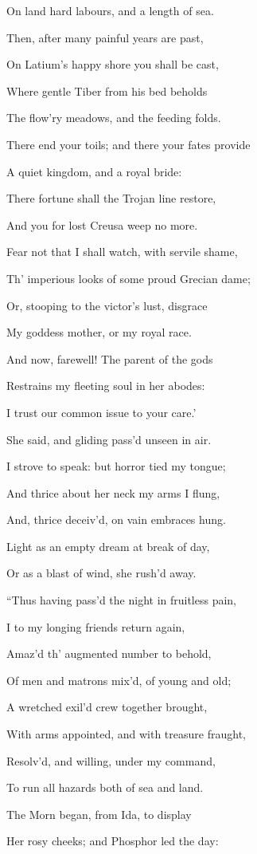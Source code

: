 On land hard labours, and a length of sea.

Then, after many painful years are past,

On Latium’s happy shore you shall be cast,

Where gentle Tiber from his bed beholds

The flow’ry meadows, and the feeding folds.

There end your toils; and there your fates provide

A quiet kingdom, and a royal bride:

There fortune shall the Trojan line restore,

And you for lost Creusa weep no more.

Fear not that I shall watch, with servile shame,

Th’ imperious looks of some proud Grecian dame;

Or, stooping to the victor’s lust, disgrace

My goddess mother, or my royal race.

And now, farewell! The parent of the gods

Restrains my fleeting soul in her abodes:

I trust our common issue to your care.’

She said, and gliding pass’d unseen in air.

I strove to speak: but horror tied my tongue;

And thrice about her neck my arms I flung,

And, thrice deceiv’d, on vain embraces hung.

Light as an empty dream at break of day,

Or as a blast of wind, she rush’d away.

“Thus having pass’d the night in fruitless pain,

I to my longing friends return again,

Amaz’d th’ augmented number to behold,

Of men and matrons mix’d, of young and old;

A wretched exil’d crew together brought,

With arms appointed, and with treasure fraught,

Resolv’d, and willing, under my command,

To run all hazards both of sea and land.

The Morn began, from Ida, to display

Her rosy cheeks; and Phosphor led the day:

